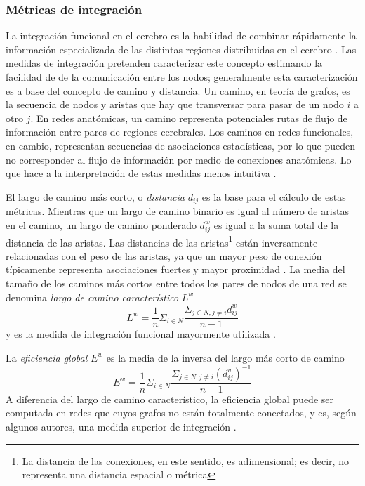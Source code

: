 \subsubsection{Métricas de integración}
La integración funcional en el cerebro es la habilidad de combinar rápidamente la información especializada de las distintas regiones distribuidas en el cerebro \parencite{Tononi1994}.
Las medidas de integración pretenden caracterizar este concepto estimando la facilidad de de la comunicación entre los nodos; generalmente esta caracterización es a base del concepto de camino y distancia.
Un camino, en teoría de grafos, es la secuencia de nodos y aristas que hay que transversar para pasar de un nodo $i$ a otro $j$.
En redes anatómicas, un camino representa potenciales rutas de flujo de información entre pares de regiones cerebrales.
Los caminos en redes funcionales, en cambio, representan secuencias de asociaciones estadísticas, por lo que pueden no corresponder al flujo de información por medio de conexiones anatómicas. Lo que hace a la interpretación de estas medidas menos intuitiva \parencite{Rubinov2010}. \par
El largo de camino más corto, o \emph{distancia} $d_{ij}$ es la base para el cálculo de estas métricas.
Mientras que un largo de camino binario es igual al número de aristas en el camino, un largo de camino ponderado $d_{ij}^w$ es igual a la suma total de la distancia de las aristas.
Las distancias de las aristas\footnote{La distancia de las conexiones, en este sentido, es adimensional; es decir, no representa una distancia espacial o métrica} están inversamente relacionadas con el peso de las aristas, ya que un mayor peso de conexión típicamente representa asociaciones fuertes y mayor proximidad \parencite{Rubinov2010}.
La media del tamaño de los caminos más cortos entre todos los pares de nodos de una red se denomina \emph{largo de camino característico} $L^w$ \parencite{Watts1998}
\begin{equation}\label{eqCPL}
    L^w=\frac{1}{n}\Sigma_{i \in N}\frac{\Sigma_{j \in N,j\neq i}d_{ij}^w}{n-1}
\end{equation}
y es la medida de integración funcional mayormente utilizada \parencite{Rubinov2010}.\par
La \emph{eficiencia global} $E^w$ \parencite{Latora2001} es la media de la inversa del largo más corto de camino
\begin{equation}\label{eqEglob}
    E^w=\frac{1}{n}\Sigma_{i \in N}\frac{\Sigma_{j \in N, j \neq i}(d_{ij}^w)^{-1}}{n-1}
\end{equation}
A diferencia del largo de camino característico, la eficiencia global puede ser computada en redes que cuyos grafos no están totalmente conectados, y es, según algunos autores, una medida superior de integración \parencite{Achard2007}.

